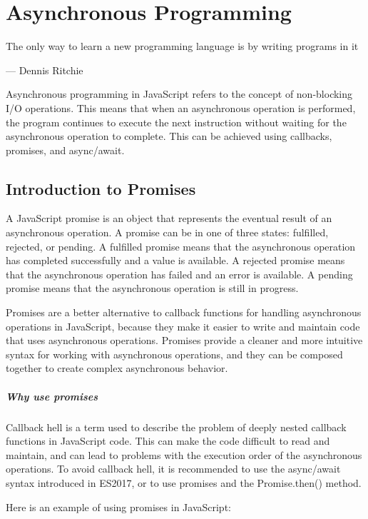 {\justifying
	\chapter{Asynchronous Programming}
	\epigraph{The only way to learn a new programming language is by writing programs in it}{--- \textup{Dennis Ritchie}}


 Asynchronous programming in JavaScript refers to the concept of non-blocking I/O operations. This means that when an asynchronous operation is performed, the program continues to execute the next instruction without waiting for the asynchronous operation to complete. This can be achieved using callbacks, promises, and async/await.

 \section{Introduction to Promises}

A JavaScript promise is an object that represents the eventual result of an asynchronous operation. A promise can be in one of three states: fulfilled, rejected, or pending. A fulfilled promise means that the asynchronous operation has completed successfully and a value is available. A rejected promise means that the asynchronous operation has failed and an error is available. A pending promise means that the asynchronous operation is still in progress.

Promises are a better alternative to callback functions for handling asynchronous operations in JavaScript, because they make it easier to write and maintain code that uses asynchronous operations. Promises provide a cleaner and more intuitive syntax for working with asynchronous operations, and they can be composed together to create complex asynchronous behavior.

\paragraph{Why use promises}
Callback hell is a term used to describe the problem of deeply nested callback functions in JavaScript code. This can make the code difficult to read and maintain, and can lead to problems with the execution order of the asynchronous operations. To avoid callback hell, it is recommended to use the async/await syntax introduced in ES2017, or to use promises and the Promise.then() method.

 Here is an example of using promises in JavaScript:

}
